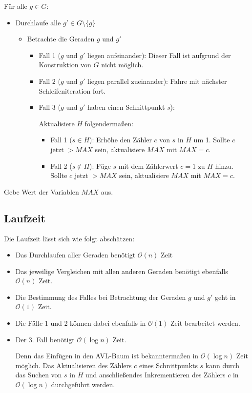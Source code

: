 \documentclass[a4paper]{article}
\begin{document}
 Für alle $g \in G$:
 \begin{itemize}
  \item Durchlaufe alle $g' \in G \setminus \{g\}$ 
  \begin{itemize}
   \item Betrachte die Geraden $g$ und $g'$
   \begin{itemize}
       \item Fall 1 ($g$ und $g'$ liegen aufeinander):
	Dieser Fall ist aufgrund der Konstruktion von $G$ nicht möglich.
       \item Fall 2 ($g$ und $g'$ liegen parallel zueinander):
	Fahre mit nächster Schleifeniteration fort.
       \item Fall 3 ($g$ und $g'$ haben einen Schnittpunkt $s$):
       
	Aktualisiere $H$ folgendermaßen:
	\begin{itemize}
	 \item Fall 1 ($s \in H$):
	 Erhöhe den Zähler $c$ von $s$ in $H$ um 1.
	 Sollte $c$ jetzt $> MAX$ sein, aktualisiere $MAX$ mit $MAX = c$.
	 \item Fall 2 ($s \notin H$):
	 Füge $s$ mit dem Zählerwert $c = 1$ zu $H$ hinzu.
	 Sollte $c$ jetzt $> MAX$ sein, aktualisiere $MAX$ mit $MAX = c$.
	\end{itemize}

   \end{itemize}
 
  \end{itemize}
 \end{itemize}
 Gebe Wert der Variablen $MAX$ aus.
 
 \subsection*{Laufzeit}
 Die Laufzeit lässt sich wie folgt abschätzen:
 
 \begin{itemize}
  \item Das Durchlaufen aller Geraden benötigt $\mathcal{O}(n)$ Zeit
    \item Das jeweilige Vergleichen mit allen anderen Geraden benötigt ebenfalls $\mathcal{O}(n)$ Zeit.
  \item Die Bestimmung des Falles bei Betrachtung der Geraden $g$ und $g'$ geht in $\mathcal{O}(1)$ Zeit.
  \item Die Fälle 1 und 2 können dabei ebenfalls in $\mathcal{O}(1)$ Zeit bearbeitet werden.
  \item Der 3. Fall benötigt $\mathcal{O}(\log n)$ Zeit. 
  
  Denn das Einfügen in den AVL-Baum ist bekanntermaßen in $\mathcal{O}(\log n)$ Zeit möglich.
  Das Aktualisieren des Zählers $c$ eines Schnittpunkts $s$ kann durch das Suchen von $s$ in $H$
  und anschließendes Inkrementieren des Zählers $c$ in $\mathcal{O}(\log n)$ durchgeführt werden.
  
 \end{itemize}
 
\end{document}
